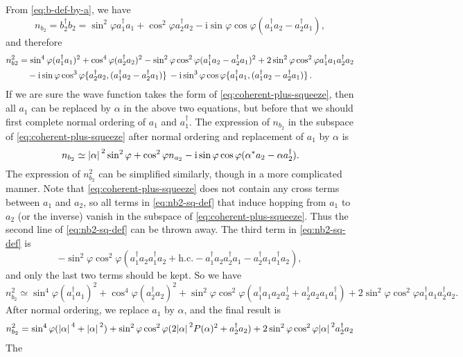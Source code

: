 \documentclass[hyperref, a4paper]{article}
\newcommand*{\ii}{\mathrm{i}}
\begin{document}
From \eqref{eq:b-def-by-a}, we have 
\begin{equation}
    n_{b_2} = b_2^\dagger b_2 = 
    \sin^2 \varphi a_1^\dagger a_1 + \cos^2 \varphi a_2^\dagger a_2
    - \ii \sin \varphi \cos \varphi (a_1^\dagger a_2 - a_2^\dagger a_1),
\end{equation}
and therefore 
\begin{equation}
    \begin{aligned}
        n_{b2}^2 &= \sin^4 \varphi (a_1^\dagger a_1)^2 + \cos^4 \varphi (a_2^\dagger a_2)^2 - \sin^2 \varphi \cos^2 \varphi (a_1^\dagger a_2 - a_2^\dagger a_1)^2 + 2 \sin^2 \varphi \cos^2 \varphi a_1^\dagger a_1 a_2^\dagger a_2 \\
        &\quad - \ii \sin \varphi \cos^3 \varphi \acomm*{a_2^\dagger a_2}{(a_1^\dagger a_2 - a_2^\dagger a_1)}
        - \ii \sin^3 \varphi \cos \varphi \acomm*{a_1^\dagger a_1}{(a_1^\dagger a_2 - a_2^\dagger a_1)}.
    \end{aligned}
    \label{eq:nb2-sq-def}
\end{equation}
If we are sure the wave function takes the form of \eqref{eq:coherent-plus-squeeze},
then all $a_1$ can be replaced by $\alpha$ in the above two equations,
but before that we should first complete normal ordering of $a_1$ and $a_1^\dagger$.
The expression of $n_{b_2}$ 
in the subspace of \eqref{eq:coherent-plus-squeeze}
after normal ordering and replacement of $a_1$ by $\alpha$ is 
\begin{equation}
    n_{b_2} \simeq \abs*{\alpha}^2 \sin^2 \varphi + \cos^2 \varphi n_{a_2} 
    - \ii \sin \varphi \cos \varphi (\alpha^* a_2 - \alpha a_2^\dagger).
\end{equation}
The expression of $n_{b_2}^2$ can be simplified similarly,
though in a more complicated manner.
Note that \eqref{eq:coherent-plus-squeeze} does not contain any cross terms between $a_1$ and $a_2$,
so all terms in \eqref{eq:nb2-sq-def} that induce hopping from $a_1$ to $a_2$ (or the inverse) 
vanish in the subspace of \eqref{eq:coherent-plus-squeeze}.
Thus the second line of \eqref{eq:nb2-sq-def} can be thrown away.
The third term in \eqref{eq:nb2-sq-def} is 
\[
    - \sin^2 \varphi \cos^2 \varphi (
        a_1^\dagger a_2 a_1^\dagger a_2 + \text{h.c.}
        - a_1^\dagger a_2 a_2^\dagger a_1 - a_2^\dagger a_1 a_1^\dagger a_2
    ),
\]
and only the last two terms should be kept.
So we have 
\[
    n^2_{b_2} \simeq \sin^4 \varphi (a_1^\dagger a_1)^2 + \cos^4 \varphi (a_2^\dagger a_2)^2
    + \sin^2 \varphi \cos^2 \varphi (a_1^\dagger a_1 a_2 a_2^\dagger + a_2^\dagger a_2 a_1 a_1^\dagger)
    +2 \sin^2 \varphi \cos^2 \varphi a_1^\dagger a_1 a_2^\dagger a_2.
\]
After normal ordering, we replace $a_1$ by $\alpha$, and the final result is 
\begin{equation}
    \begin{aligned}
        n_{b_2}^2 &= \sin^4 \varphi (\abs*{\alpha}^4 + \abs*{\alpha}^2) + \sin^2 \varphi \cos^2 \varphi (2 \abs*{\alpha}^2 P(\alpha)^2 + a_2^\dagger a_2) + 2 \sin^2 \varphi \cos^2 \varphi \abs*{\alpha}^2 a_2^\dagger a_2 \\
    \end{aligned}
    \label{eq:nb2-square-mf}
\end{equation}
The 



\end{document}
